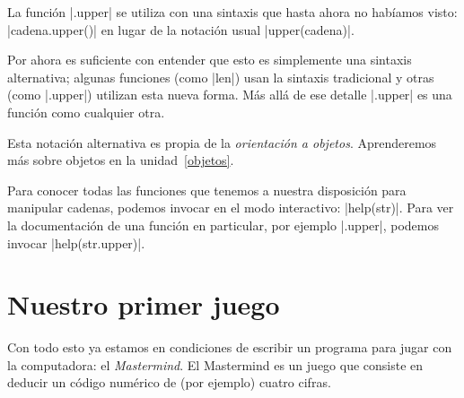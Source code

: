 \begin{sabias_que}
La función |.upper| se utiliza con una sintaxis que hasta ahora no habíamos
visto: |cadena.upper()| en lugar de la notación usual |upper(cadena)|.

Por ahora es suficiente con entender que esto es simplemente una sintaxis
alternativa; algunas funciones (como |len|) usan la sintaxis tradicional y
otras (como |.upper|) utilizan esta nueva forma. Más allá de ese detalle
|.upper| es una función como cualquier otra.

Esta notación alternativa es propia de la \emph{orientación a objetos}. Aprenderemos más
sobre objetos en la unidad~\ref{objetos}.
\end{sabias_que}

Para conocer todas las funciones que tenemos a nuestra disposición para
manipular cadenas, podemos invocar en el modo interactivo: |help(str)|.
Para ver la documentación de una función en particular, por ejemplo |.upper|,
podemos invocar |help(str.upper)|.

\section{Nuestro primer juego}

Con todo esto ya estamos en condiciones de escribir un programa para jugar con
la computadora: el \emph{Mastermind}. El Mastermind es un juego que consiste en
deducir un código numérico de (por ejemplo) cuatro cifras.

